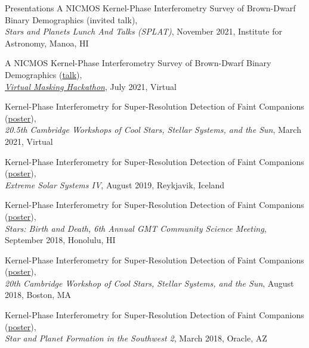 \documentclass{resume} %
\begin{document}
\begin{rSection}{Presentations}
    A NICMOS Kernel-Phase Interferometry Survey of Brown-Dwarf Binary Demographics (invited talk),\\\emph{Stars and Planets Lunch And Talks (SPLAT)}, November 2021, Institute for Astronomy, Manoa, HI
    \vspace{-0.06cm}
    
    A NICMOS Kernel-Phase Interferometry Survey of Brown-Dwarf Binary Demographics (\href{https://drive.google.com/file/d/1vVPNLd2eT12pVJnRhTFYX5jqAVCRl_wg/view}{talk}),\\\emph{\href{https://sites.google.com/uci.edu/virtualmaskinghackathon/home}{Virtual Masking Hackathon}}, July 2021, Virtual
    \vspace{-0.06cm}
    
    Kernel-Phase Interferometry for Super-Resolution Detection of Faint Companions (\href{http://smfactor.github.io/assets/pubs/CS20p5Poster.pdf}{poster}), \\\emph{20.5th Cambridge Workshops of Cool Stars, Stellar Systems, and the Sun}, March 2021, Virtual 
    \vspace{-0.06cm}
    
    Kernel-Phase Interferometry for Super-Resolution Detection of Faint Companions (\href{http://smfactor.github.io/assets/pubs/ESSIVPoster.pdf}{poster}), \\\emph{Extreme Solar Systems IV}, August 2019, Reykjavik, Iceland 
    \vspace{-0.06cm}

    Kernel-Phase Interferometry for Super-Resolution Detection of Faint Companions (\href{http://smfactor.github.io/publications/CS20Poster.pdf}{poster}),\\\emph{Stars: Birth and Death, 6th Annual GMT Community Science Meeting}, September 2018, Honolulu, HI
    \vspace{-0.06cm}

    Kernel-Phase Interferometry for Super-Resolution Detection of Faint Companions (\href{http://smfactor.github.io/publications/CS20Poster.pdf}{poster}),\\\emph{20th Cambridge Workshop of Cool Stars, Stellar Systems, and the Sun}, August 2018, Boston, MA
    \vspace{-0.06cm}

    Kernel-Phase Interferometry for Super-Resolution Detection of Faint Companions (\href{http://smfactor.github.io/publications/SPF2Poster.pdf}{poster}),\\\emph{Star and Planet Formation in the Southwest 2}, March 2018, Oracle, AZ
    \vspace{-0.06cm}
    

\end{rSection}
\end{document}
